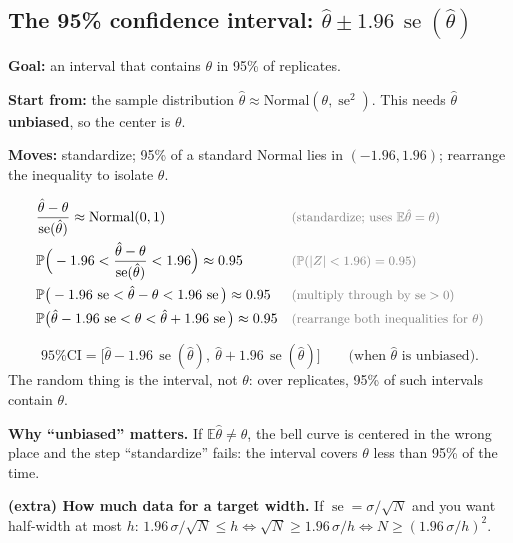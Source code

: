 \documentclass[11pt]{article}
\newcommand{\E}{\mathbb{E}}
\newcommand{\se}{\operatorname{se}}
\renewcommand{\P}{\mathbb{P}}
\newcommand{\Norm}{\text{Normal}}
\newcommand{\why}[1]{&&\text{\small\color{gray}(#1)}}
\newcommand{\mv}[1]{\tcbox[on line, colback=methodclr, colframe=methodclr, coltext=white, boxsep=0pt,
  left=2pt, right=2pt, top=1pt, bottom=1pt, arc=1.5pt]{\sffamily\scriptsize\bfseries M#1}}
\newcommand{\goal}[1]{\textbf{Goal:} #1\par}
\newcommand{\start}[1]{\textbf{Start from:} #1\par}
\newcommand{\moves}[1]{\textbf{Moves:} #1\par}
\begin{document}
\subsection{The 95\% confidence interval: $\hat\theta\pm1.96\,\se(\hat\theta)$}\label{sec:ci}
\begin{methodbox}
\goal{an interval that contains $\theta$ in 95\% of replicates.}
\start{the sample distribution $\hat\theta\approx\Norm(\theta,\se^2)$. This needs $\hat\theta$ \textbf{unbiased}, so the center is $\theta$.}
\moves{\mv{6} standardize; \mv{9} 95\% of a standard Normal lies in $(-1.96,1.96)$; rearrange the inequality to isolate $\theta$.}
\end{methodbox}
\begin{align*}
&\frac{\hat\theta-\theta}{\se(\hat\theta)}\approx\Norm(0,1) \why{standardize; uses $\E\hat\theta=\theta$}\\
&\P\Big(-1.96<\frac{\hat\theta-\theta}{\se(\hat\theta)}<1.96\Big)\approx0.95 \why{$\P(|Z|<1.96)=0.95$}\\
&\P\big(-1.96\,\se<\hat\theta-\theta<1.96\,\se\big)\approx0.95 \why{multiply through by $\se>0$}\\
&\P\big(\hat\theta-1.96\,\se<\theta<\hat\theta+1.96\,\se\big)\approx0.95 \why{rearrange both inequalities for $\theta$}
\end{align*}
\begin{keybox}
\[\text{95\% CI}=\big[\hat\theta-1.96\,\se(\hat\theta),\ \hat\theta+1.96\,\se(\hat\theta)\big]\qquad\text{(when $\hat\theta$ is unbiased).}\]
The random thing is the interval, not $\theta$: over replicates, 95\% of such intervals contain $\theta$.
\end{keybox}
\textbf{Why ``unbiased'' matters.} If $\E\hat\theta\ne\theta$, the bell curve is centered in the wrong place and the step ``standardize'' fails:
the interval covers $\theta$ less than 95\% of the time.

\textbf{(extra) How much data for a target width.} If $\se=\sigma/\sqrt N$ and you want half-width at most $h$:
$1.96\,\sigma/\sqrt N\le h\iff\sqrt N\ge1.96\,\sigma/h\iff N\ge(1.96\,\sigma/h)^2$.
\end{document}
